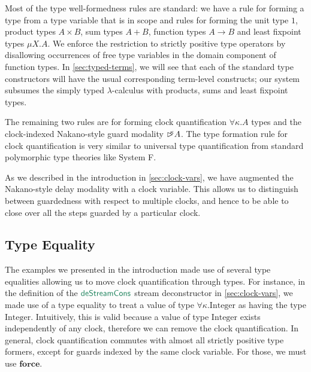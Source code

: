 \documentclass[natbib]{sigplanconf}
\newcommand{\elim}[1]{\textcolor{elim}{\textsf{#1}}}
\newcommand{\kw}[1]{\textbf{#1}}
\newcommand{\tyname}[1]{\textrm{#1}}
\newcommand{\delay}[1]{\mathord{\rhd\kern-0.4em^{#1}}}
\begin{document}
Most of the type well-formedness rules are standard: we have a rule
for forming a type from a type variable that is in scope and rules for
forming the unit type $1$, product types $A \times B$, sum types $A +
B$, function types $A \to B$ and least fixpoint types $\mu X. A$. We
enforce the restriction to strictly positive type operators by
disallowing occurrences of free type variables in the domain component
of function types. In \autoref{sec:typed-terms}, we will see that each
of the standard type constructors will have the usual corresponding
term-level constructs; our system subsumes the simply typed
$\lambda$-calculus with products, sums and least fixpoint types.

The remaining two rules are for forming clock quantification $\forall
\kappa.A$ types and the clock-indexed Nakano-style guard modality
$\delay\kappa A$. The type formation rule for clock quantification is
very similar to universal type quantification from standard
polymorphic type theories like System F. 

As we described in the introduction in \autoref{sec:clock-vars}, we
have augmented the Nakano-style delay modality with a clock
variable. This allows us to distinguish between guardedness with
respect to multiple clocks, and hence to be able to close over all the
steps guarded by a particular clock.

\subsection{Type Equality}
\label{sec:type-equality}

The examples we presented in the introduction made use of several type
equalities allowing us to move clock quantification through types. For
instance, in the definition of the $\elim{deStreamCons}$ stream
deconstructor in \autoref{sec:clock-vars}, we made use of a type
equality to treat a value of type $\forall \kappa. \tyname{Integer}$
as having the type $\tyname{Integer}$. Intuitively, this is valid
because a value of type $\tyname{Integer}$ exists independently of any
clock, therefore we can remove the clock quantification. In general,
clock quantification commutes with almost all strictly positive type
formers, except for guards indexed by the same clock variable. For
those, we must use $\kw{force}$.
\end{document}
